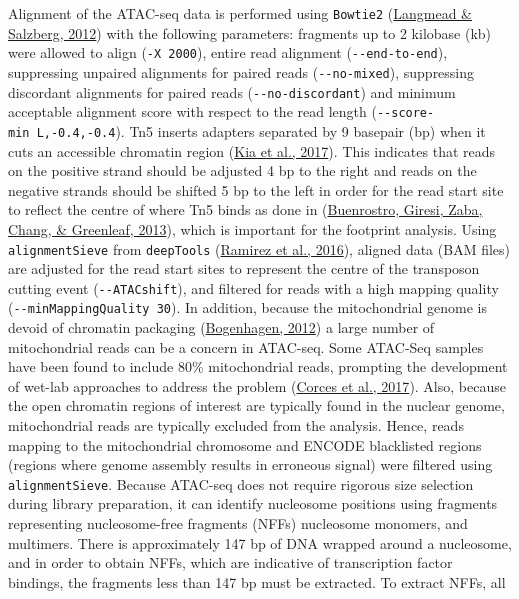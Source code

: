 \documentclass[12pt,twoside]{reedthesis}
\begin{document}
Alignment of the ATAC-seq data is performed using \texttt{Bowtie2}
(\protect\hyperlink{ref-langmead2012}{Langmead \& Salzberg, 2012}) with the following parameters: fragments up to 2 kilobase (kb) were
allowed to align (\texttt{-X\ 2000}), entire read alignment (\texttt{-\/-end-to-end}),
suppressing unpaired alignments for paired reads (\texttt{-\/-no-mixed}),
suppressing discordant alignments for paired reads (\texttt{-\/-no-discordant}) and
minimum acceptable alignment score with respect to the read length
(\texttt{-\/-score-min\ L,-0.4,-0.4}). Tn5 inserts adapters separated by 9 basepair (bp) when it
cuts an accessible chromatin region (\protect\hyperlink{ref-kia2017}{Kia et al., 2017}). This indicates that
reads on the positive strand should be adjusted 4 bp to the right and
reads on the negative strands should be shifted 5 bp to the left in
order for the read start site to reflect the centre of where Tn5 binds
as done in (\protect\hyperlink{ref-buenrostro2013}{Buenrostro, Giresi, Zaba, Chang, \& Greenleaf, 2013}), which is important for the footprint
analysis. Using \texttt{alignmentSieve} from \texttt{deepTools} (\protect\hyperlink{ref-ramirez2016}{Ramirez et al., 2016}), aligned
data (BAM files) are adjusted for the read start sites to represent the
centre of the transposon cutting event (\texttt{-\/-ATACshift}), and filtered for
reads with a high mapping quality (\texttt{-\/-minMappingQuality\ 30}). In addition,
because the mitochondrial genome is devoid of chromatin packaging
(\protect\hyperlink{ref-bogenhagen2012}{Bogenhagen, 2012}) a large number of mitochondrial reads can be a concern
in ATAC-seq. Some ATAC-Seq samples have been found to include 80\%
mitochondrial reads, prompting the development of wet-lab approaches to
address the problem (\protect\hyperlink{ref-corces2017}{Corces et al., 2017}). Also, because the open chromatin
regions of interest are typically found in the nuclear genome,
mitochondrial reads are typically excluded from the analysis. Hence,
reads mapping to the mitochondrial chromosome and ENCODE blacklisted
regions (regions where genome assembly results in erroneous signal) were
filtered using \texttt{alignmentSieve}. Because ATAC-seq does not require
rigorous size selection during library preparation, it can identify
nucleosome positions using fragments representing nucleosome-free
fragments (NFFs) nucleosome monomers, and multimers. There is
approximately 147 bp of DNA wrapped around a nucleosome, and in order to
obtain NFFs, which are indicative of transcription factor bindings, the
fragments less than 147 bp must be extracted. To extract NFFs, all
\end{document}
